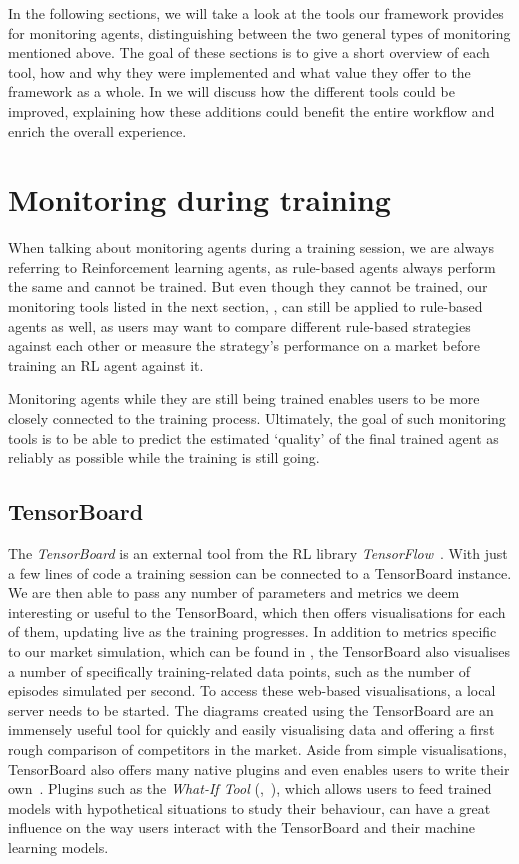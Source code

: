 In the following sections, we will take a look at the tools our framework provides for monitoring agents, distinguishing between the two general types of monitoring mentioned above. The goal of these sections is to give a short overview of each tool, how and why they were implemented and what value they offer to the framework as a whole. In  we will discuss how the different tools could be improved, explaining how these additions could benefit the entire workflow and enrich the overall experience.

\section{Monitoring during training}\label{sec:DuringTraining}

When talking about monitoring agents during a training session, we are always referring to Reinforcement learning agents, as rule-based agents always perform the same and cannot be trained. But even though they cannot be trained, our monitoring tools listed in the next section, , can still be applied to rule-based agents as well, as users may want to compare different rule-based strategies against each other or measure the strategy's performance on a market before training an RL agent against it.

Monitoring agents while they are still being trained enables users to be more closely connected to the training process. Ultimately, the goal of such monitoring tools is to be able to predict the estimated `quality' of the final trained agent as reliably as possible while the training is still going.

\subsection{TensorBoard}\label{subsec:TensorBoard}

The \emph{TensorBoard} is an external tool from the RL library \emph{TensorFlow}~\cite{TensorFlow}. With just a few lines of code a training session can be connected to a TensorBoard instance. We are then able to pass any number of parameters and metrics we deem interesting or useful to the TensorBoard, which then offers visualisations for each of them, updating live as the training progresses. In addition to metrics specific to our market simulation, which can be found in , the TensorBoard also visualises a number of specifically training-related data points, such as the number of episodes simulated per second. To access these web-based visualisations, a local server needs to be started. The diagrams created using the TensorBoard are an immensely useful tool for quickly and easily visualising data and offering a first rough comparison of competitors in the market. Aside from simple visualisations, TensorBoard also offers many native plugins and even enables users to write their own~\cite{TensorBoardPlugins}. Plugins such as the \emph{What-If Tool} (\cite{WhatIfTool},~\cite{WhatIfToolWeb}), which allows users to feed trained models with hypothetical situations to study their behaviour, can have a great influence on the way users interact with the TensorBoard and their machine learning models.

